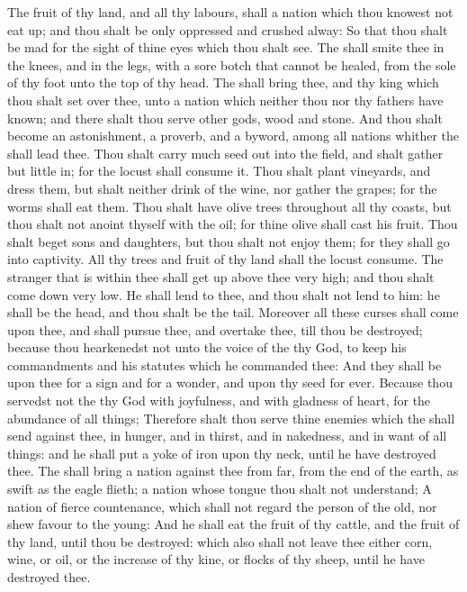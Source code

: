 \begin{biblechapter}
\verse The fruit of thy land, and all thy labours, shall a nation which thou knowest not eat up; and thou shalt be only oppressed and crushed alway:
\verse So that thou shalt be mad for the sight of thine eyes which thou shalt see.
\verse The \LORD shall smite thee in the knees, and in the legs, with a sore botch that cannot be healed, from the sole of thy foot unto the top of thy head.
\verse The \LORD shall bring thee, and thy king which thou shalt set over thee, unto a nation which neither thou nor thy fathers have known; and there shalt thou serve other gods, wood and stone.
\verse And thou shalt become an astonishment, a proverb, and a byword, among all nations whither the \LORD shall lead thee.
\verse Thou shalt carry much seed out into the field, and shalt gather but little in; for the locust shall consume it.
\verse Thou shalt plant vineyards, and dress them, but shalt neither drink of the wine, nor gather the grapes; for the worms shall eat them.
\verse Thou shalt have olive trees throughout all thy coasts, but thou shalt not anoint thyself with the oil; for thine olive shall cast his fruit.
\verse Thou shalt beget sons and daughters, but thou shalt not enjoy them; for they shall go into captivity.
\verse All thy trees and fruit of thy land shall the locust consume.
\verse The stranger that is within thee shall get up above thee very high; and thou shalt come down very low.
\verse He shall lend to thee, and thou shalt not lend to him: he shall be the head, and thou shalt be the tail.
\verse Moreover all these curses shall come upon thee, and shall pursue thee, and overtake thee, till thou be destroyed; because thou hearkenedst not unto the voice of the \LORD thy God, to keep his commandments and his statutes which he commanded thee:
\verse And they shall be upon thee for a sign and for a wonder, and upon thy seed for ever.
\verse Because thou servedst not the \LORD thy God with joyfulness, and with gladness of heart, for the abundance of all things;
\verse Therefore shalt thou serve thine enemies which the \LORD shall send against thee, in hunger, and in thirst, and in nakedness, and in want of all things: and he shall put a yoke of iron upon thy neck, until he have destroyed thee.
\verse The \LORD shall bring a nation against thee from far, from the end of the earth, as swift as the eagle flieth; a nation whose tongue thou shalt not understand;
\verse A nation of fierce countenance, which shall not regard the person of the old, nor shew favour to the young:
\verse And he shall eat the fruit of thy cattle, and the fruit of thy land, until thou be destroyed: which also shall not leave thee either corn, wine, or oil, or the increase of thy kine, or flocks of thy sheep, until he have destroyed thee.

\end{biblechapter}
